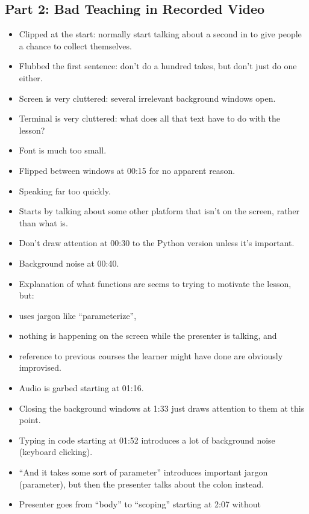 \documentclass[10pt,statementpaper]{memoir}
\providecommand{\tightlist}{%
  \setlength{\itemsep}{0pt}\setlength{\parskip}{0pt}}
\begin{document}
\subsection{Part 2: Bad Teaching in Recorded
Video}\label{part-2-bad-teaching-in-recorded-video}

\begin{itemize}
\tightlist
\item
  Clipped at the start: normally start talking about a second in to give
  people a chance to collect themselves.
\item
  Flubbed the first sentence: don't do a hundred takes, but don't just
  do one either.
\item
  Screen is very cluttered: several irrelevant background windows open.
\item
  Terminal is very cluttered: what does all that text have to do with
  the lesson?
\item
  Font is much too small.
\item
  Flipped between windows at 00:15 for no apparent reason.
\item
  Speaking far too quickly.
\item
  Starts by talking about some other platform that isn't on the screen,
  rather than what is.
\item
  Don't draw attention at 00:30 to the Python version unless it's
  important.
\item
  Background noise at 00:40.
\item
  Explanation of what functions are seems to trying to motivate the
  lesson, but:
\item
  uses jargon like ``parameterize'',
\item
  nothing is happening on the screen while the presenter is talking, and
\item
  reference to previous courses the learner might have done are
  obviously improvised.
\item
  Audio is garbed starting at 01:16.
\item
  Closing the background windows at 1:33 just draws attention to them at
  this point.
\item
  Typing in code starting at 01:52 introduces a lot of background noise
  (keyboard clicking).
\item
  ``And it takes some sort of parameter'' introduces important jargon
  (parameter), but then the presenter talks about the colon instead.
\item
  Presenter goes from ``body'' to ``scoping'' starting at 2:07 without

\end{itemize}
\end{document}
